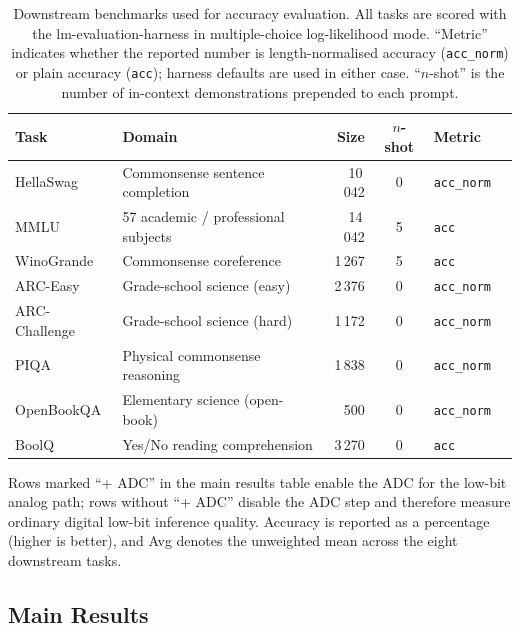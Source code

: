 \documentclass[a4paper,11pt,oneside]{article}
\theoremstyle{breakstyle}
\begin{document}
  \begin{table}[htbp]
    \centering
    \caption{Downstream benchmarks used for accuracy evaluation.  All
      tasks are scored with the lm-evaluation-harness in
      multiple-choice log-likelihood mode.  ``Metric'' indicates
      whether the reported number is length-normalised accuracy
      (\texttt{acc\_norm}) or plain accuracy (\texttt{acc}); harness
      defaults are used in either case.  ``$n$-shot'' is the number
      of in-context demonstrations prepended to each prompt.}
    \label{tab:lm_eval_tasks}
    \renewcommand{\arraystretch}{1.15}
    \setlength{\tabcolsep}{3.5pt}
    \begin{tabular}{@{}l l r c l l@{}}
      \toprule
      \textbf{Task} & \textbf{Domain} &
        \textbf{Size} & \textbf{$n$-shot} &
        \textbf{Metric} \\
      \midrule
      HellaSwag      & Commonsense sentence completion  & 10\,042 & 0 & \texttt{acc\_norm}  \\
      MMLU           & 57 academic / professional subjects & 14\,042 & 5 & \texttt{acc}  \\
      WinoGrande     & Commonsense coreference          &  1\,267 & 5 & \texttt{acc}        \\
      ARC-Easy       & Grade-school science (easy)      &  2\,376 & 0 & \texttt{acc\_norm} \\
      ARC-Challenge  & Grade-school science (hard)      &  1\,172 & 0 & \texttt{acc\_norm}  \\
      PIQA           & Physical commonsense reasoning   &  1\,838 & 0 & \texttt{acc\_norm} \\
      OpenBookQA     & Elementary science (open-book)   &    500  & 0 & \texttt{acc\_norm}  \\
      BoolQ          & Yes/No reading comprehension     &  3\,270 & 0 & \texttt{acc}     \\
      \bottomrule
    \end{tabular}
  \end{table}

  Rows marked ``+ ADC'' in the main results table enable the ADC
  for the low-bit analog path; rows without ``+ ADC'' disable the
  ADC step and therefore measure ordinary digital low-bit inference
  quality.  Accuracy is reported as a percentage (higher is
  better), and Avg denotes the unweighted mean across the
  eight downstream tasks.
  \subsection{Main Results}
  \label{sec:main_results}
\end{document}
